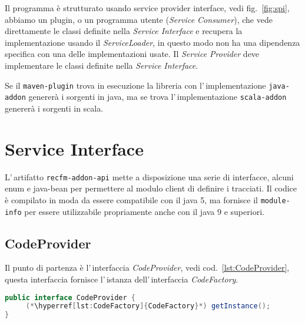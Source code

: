 \documentclass[a4paper,10pt]{report}
\begin{document}
Il programma è strutturato usando service provider interface, 
vedi fig.~\ref{fig:spi}, abbiamo un plugin, o un programma utente 
(\textsl{Service Consumer}), che vede direttamente le classi definite nella 
\textsl{Service Interface} e recupera la implementazione usando il 
\textsl{ServiceLoader}, in questo modo non ha una dipendenza specifica con una
delle implementazioni usate. 
Il \textsl{Service Provider} deve implementare le classi definite nella 
\textsl{Service Interface}.

Se il \verb!maven-plugin! trova in esecuzione la libreria con 
l'\,implementazione \verb!java-addon! genererà i sorgenti in java, ma se trova
l'\,implementazione \verb!scala-addon! genererà i sorgenti in scala.

\chapter{Service Interface}
L'\,artifatto \verb!recfm-addon-api! mette a disposizione una serie di 
interfacce, alcuni enum e java-bean per permettere al modulo client di definire
i tracciati. 
Il codice è compilato in moda da essere compatibile con il java 5, ma fornisce
il \verb!module-info! per essere utilizzabile propriamente anche con il java 9
e superiori.

\section{CodeProvider}
Il punto di partenza è l'\,interfaccia \textsl{CodeProvider}, vedi 
cod.~\ref{lst:CodeProvider}, questa interfaccia fornisce l'\,istanza 
dell'\,in\-ter\-fac\-cia \textsl{CodeFactory}.

\begin{figure*}[!htb]
\begin{lstlisting}[language=java, caption=interfaccia CodeProvider, 
label=lst:CodeProvider]
public interface CodeProvider {
     (*\hyperref[lst:CodeFactory]{CodeFactory}*) getInstance();
}
\end{lstlisting}
\end{figure*}
\end{document}
